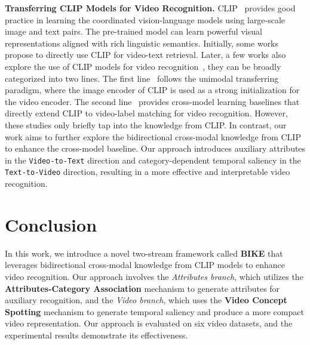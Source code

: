 \documentclass[10pt,twocolumn,letterpaper]{article}
\begin{document}
\noindent\textbf{Transferring CLIP Models for Video Recognition.}
CLIP~\cite{CLIP} provides good practice in learning the coordinated vision-language models using large-scale image and text pairs. The pre-trained model can learn powerful visual representations aligned with rich linguistic semantics. 
Initially, some works~\cite{luo2022clip4clip,zhao2022centerclip,wu2022cap4video,fang2023uatvr} propose to directly use CLIP for video-text retrieval. 
Later, a few works also explore the use of CLIP models for video recognition~\cite{wang2021actionclip,ju2022prompting,evl,x-clip,st-adaptor,text4vis,yang2023aim}, they can be broadly categorized into two lines. The first line~\cite{st-adaptor,evl,yang2023aim} follows the unimodal transferring paradigm, where the image encoder of CLIP is used as a strong initialization for the video encoder. The second line~\cite{wang2021actionclip,ju2022prompting,text4vis,x-clip} provides cross-model learning baselines that directly extend CLIP to video-label matching for video recognition.
However, these studies only briefly tap into the knowledge from CLIP.
In contrast, our work aims to further explore the bidirectional cross-modal knowledge from CLIP to enhance the cross-model baseline. Our approach introduces auxiliary attributes in the \texttt{Video-to-Text} direction and category-dependent temporal saliency in the \texttt{Text-to-Video} direction, resulting in a more effective and interpretable video recognition. 

 
\section{Conclusion}






In this work, we introduce a novel two-stream framework called \textbf{BIKE} that leverages bidirectional cross-modal knowledge from CLIP models to enhance video recognition. Our approach involves the \emph{Attributes branch}, which utilizes the \textbf{Attributes-Category Association} mechanism to generate attributes for auxiliary recognition, and the \emph{Video branch}, which uses the \textbf{Video Concept Spotting} mechanism to generate temporal saliency and produce a more compact video representation. Our approach is evaluated on six video datasets, and the experimental results demonstrate its effectiveness. 


{\small


}
\end{document}
